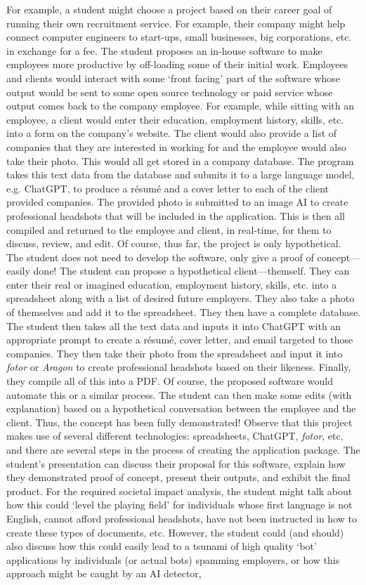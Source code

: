 \documentclass[11pt,letterpaper]{article}
\begin{document}
For example, a student might choose a project based on their career goal of running their own recruitment service. For example, their company might help connect computer engineers to start-ups, small businesses, big corporations, etc. in exchange for a fee. The student proposes an in-house software to make employees more productive by off-loading some of their initial work. Employees and clients would interact with some `front facing' part of the software whose output would be sent to some open source technology or paid service whose output comes back to the company employee. For example, while sitting with an employee, a client would enter their education, employment history, skills, etc. into a form on the company's website. The client would also provide a list of companies that they are interested in working for and the employee would also take their photo. This would all get stored in a company database. The program takes this text data from the database and submits it to a large language model, e.g. ChatGPT, to produce a r\'esum\'e and a cover letter to each of the client provided companies. The provided photo is submitted to an image AI to create professional headshots that will be included in the application. This is then all compiled and returned to the employee and client, in real-time, for them to discuss, review, and edit. Of course, thus far, the project is only hypothetical. The student does not need to develop the software, only give a proof of concept---easily done! The student can propose a hypothetical client---themself. They can enter their real or imagined education, employment history, skills, etc. into a spreadsheet along with a list of desired future employers. They also take a photo of themselves and add it to the spreadsheet. They then have a complete database. The student then takes all the text data and inputs it into ChatGPT with an appropriate prompt to create a r\'esum\'e, cover letter, and email targeted to those companies. They then take their photo from the spreadsheet and input it into \textit{fotor} or \textit{Aragon} to create professional headshots based on their likeness. Finally, they compile all of this into a PDF. Of course, the proposed software would automate this or a similar process. The student can then make some edits (with explanation) based on a hypothetical conversation between the employee and the client. Thus, the concept has been fully demonstrated! Observe that this project makes use of several different technologies: spreadsheets, ChatGPT, \textit{fotor}, etc, and there are several steps in the process of creating the application package. The student's presentation can discuss their proposal for this software, explain how they demonstrated proof of concept, present their outputs, and exhibit the final product. For the required societal impact analysis, the student might talk about how this could `level the playing field' for individuals whose first language is not English, cannot afford professional headshots, have not been instructed in how to create these types of documents, etc. However, the student could (and should) also discuss how this could easily lead to a tsunami of high quality `bot' applications by individuals (or actual bots) spamming employers, or how this approach might be caught by an AI detector, 
\end{document}
